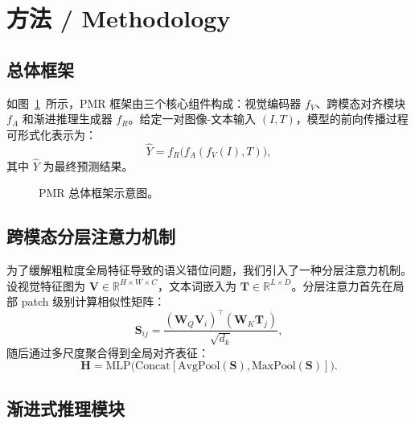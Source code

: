 \section{方法 / Methodology}\label{sec:method}

\subsection{总体框架}

如图~\ref{fig:framework}~所示，PMR 框架由三个核心组件构成：视觉编码器 $f_V$、跨模态对齐模块 $f_A$ 和渐进推理生成器 $f_R$。给定一对图像-文本输入 $(I, T)$，模型的前向传播过程可形式化表示为：
\begin{equation}
  \hat{Y} = f_R\bigl(f_A(f_V(I), T)\bigr),
\end{equation}
其中 $\hat{Y}$ 为最终预测结果。

\begin{figure}[htbp]
  \centering
  \caption{PMR 总体框架示意图。}
  \label{fig:framework}
\end{figure}

\subsection{跨模态分层注意力机制}

为了缓解粗粒度全局特征导致的语义错位问题，我们引入了一种分层注意力机制。设视觉特征图为 $\mathbf{V} \in \mathbb{R}^{H \times W \times C}$，文本词嵌入为 $\mathbf{T} \in \mathbb{R}^{L \times D}$。分层注意力首先在局部 patch 级别计算相似性矩阵：
\begin{equation}
  \mathbf{S}_{ij} = \frac{(\mathbf{W}_Q \mathbf{V}_i)^\top (\mathbf{W}_K \mathbf{T}_j)}{\sqrt{d_k}},
\end{equation}
随后通过多尺度聚合得到全局对齐表征：
\begin{equation}
  \mathbf{H} = \text{MLP}\bigl(\text{Concat}[\text{AvgPool}(\mathbf{S}), \text{MaxPool}(\mathbf{S})]\bigr).
\end{equation}

\subsection{渐进式推理模块}

